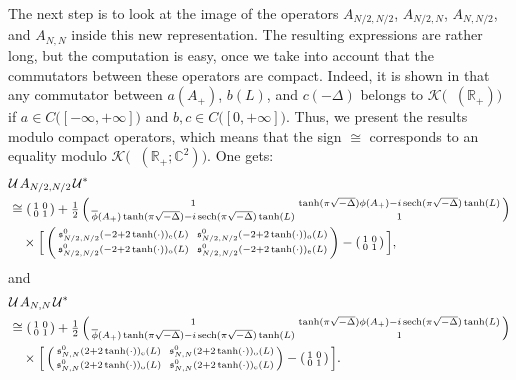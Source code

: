 \documentclass[11pt]{article}
\def\C{\mathbb C}
\def\K{\mathscr K}
\def\R{\mathbb R}
\def\s{\mathfrak s}
\def\U{\mathcal U}
\def\DD{\sqrt{-\Delta}}
\def\ltwo{\mathop{\mathrm{L}^2}\nolimits}
\def\sech{\mathop{\mathrm{sech}}\nolimits}
\begin{document}
The next step is to look at the image of the operators $A_{N/2,N/2}$, $A_{N/2,N}$, $A_{N,N/2}$, and $A_{N,N}$ inside this new representation. The resulting expressions are rather long,
but the computation is easy, once we take into account that the commutators between these operators are compact. Indeed, it is shown in \cite[Sec.~5.5--5.7]{Cordes}
that any commutator between $a(A_+)$, $b(L)$, and $c(-\Delta)$ belongs to $\K\big(\ltwo(\R_+)\big)$  if $a\in C\big([-\infty,+\infty]\big)$ and $b, c \in C\big([0,+ \infty]\big)$.
Thus, we present the results modulo compact operators, which means
that the sign $\cong$ corresponds to an equality modulo $\K\big(\ltwo(\R_+;\C^2)\big)$.
One gets:
\begin{align}\label{eq_D1b}
\nonumber & \U \;\! A_{N/2,N/2}\;\! \U^*\\
\nonumber & \cong \left(\begin{smallmatrix}
1 & 0 \\
0 & 1
\end{smallmatrix}\right)+
\tfrac12\left(\begin{smallmatrix}
    1 & \tanh(\pi\DD)\phi(A_+)-i\sech(\pi\DD)\tanh(L)\\
    \overline{\phi}(A_+)\tanh(\pi\DD)-i\sech(\pi\DD)\tanh(L) & 1
\end{smallmatrix}\right)\\
& \quad \times \Big[\left(\begin{smallmatrix}
    \s^0_{N/2,N/2}(-2+2\tanh(\cdot))_{\rm e}(L) & \ \s^0_{N/2,N/2}(-2+2\tanh(\cdot))_{\rm o}(L)\\
    \s^0_{N/2,N/2}(-2+2\tanh(\cdot))_{\rm o}(L) &\ \s^0_{N/2,N/2}(-2+2\tanh(\cdot))_{\rm e}(L)
\end{smallmatrix}\right)-\left(\begin{smallmatrix}
1 & 0 \\
0 & 1
\end{smallmatrix}\right)\Big],
\end{align}
and 
\begin{align}\label{eq_D4b}
\nonumber & \U\;\!  A_{N,N}\;\!  \U^*\\
\nonumber & \cong \left(\begin{smallmatrix}
1 & 0 \\
0 & 1
\end{smallmatrix}\right)+
\tfrac12\left(\begin{smallmatrix}
    1 & \tanh(\pi\DD)\phi(A_+)-i\sech(\pi\DD)\tanh(L)\\
    \overline{\phi}(A_+)\tanh(\pi\DD)-i\sech(\pi\DD)\tanh(L) & 1
\end{smallmatrix}\right)\\
& \quad \times \Big[\left(\begin{smallmatrix}
    \s^0_{N,N}(2+2\tanh(\cdot))_{\rm e}(L) & \ \s^0_{N,N}(2+2\tanh(\cdot))_{\rm o}(L)\\
    \s^0_{N,N}(2+2\tanh(\cdot))_{\rm o}(L) &\ \s^0_{N,N}(2+2\tanh(\cdot))_{\rm e}(L)
\end{smallmatrix}\right)-\left(\begin{smallmatrix}
1 & 0 \\
0 & 1
\end{smallmatrix}\right)\Big].
\end{align}
\end{document}
